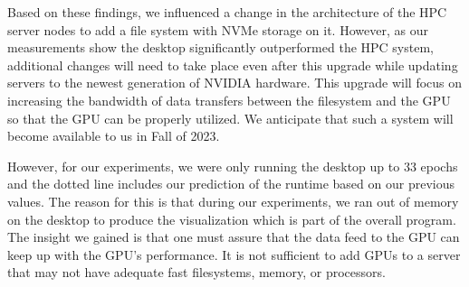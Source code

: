 \documentclass[utf8]{FrontiersinVancouver} %
\begin{document}
Based on these findings, we influenced a change in the architecture of the HPC server nodes to add a file system with NVMe storage on it. However, as our measurements show the desktop significantly outperformed the HPC system, additional changes will need to take place even after this upgrade while updating servers to the newest generation of NVIDIA hardware. This upgrade will focus on increasing the bandwidth of data transfers between the filesystem and the GPU so that the GPU can be properly utilized. We anticipate that such a system will become available to us in Fall of 2023.

However, for our experiments, we were only running the desktop up to 33 epochs and the dotted line includes our prediction of the runtime based on our previous values. The reason for this is that during our experiments, we ran out of memory on the desktop to produce the visualization which is part of the overall program. The insight we gained is that one must assure that the data feed to the GPU can keep up with the GPU's performance. It is not sufficient to add GPUs to a server that may not have adequate fast filesystems, memory, or processors.
\end{document}
